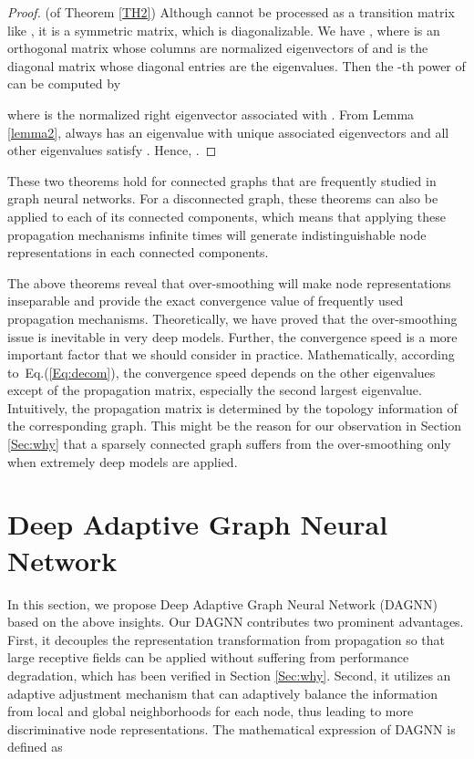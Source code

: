 \documentclass[sigconf]{acmart}
\begin{document}
\begin{proof}
(of Theorem \ref{TH2}) Although
 cannot be processed as a
transition matrix like , it
is a symmetric matrix, which is diagonalizable. We have
,
where  is an orthogonal matrix whose columns
are normalized eigenvectors of
 and 
is the diagonal matrix whose diagonal entries are the
eigenvalues. Then the -th power of
 can be computed by

where  is the normalized right eigenvector
associated with . From Lemma \ref{lemma2},
 always has an eigenvalue 
with unique associated eigenvectors and all other eigenvalues
 satisfy . Hence,
.
\end{proof}

These two theorems hold for connected graphs that are frequently
studied in graph neural networks. For a disconnected graph, these
theorems can also be applied to each of its connected components,
which means that applying these propagation mechanisms infinite times
will generate indistinguishable node representations in each
connected components.

The above theorems reveal that over-smoothing will make node
representations inseparable and provide the exact convergence value of
frequently used propagation mechanisms. Theoretically, we have
proved that the over-smoothing issue is inevitable in very deep models.
Further, the convergence speed is a more important factor that we
should consider in practice. Mathematically, according to~Eq.(\ref{Eq:decom}), the convergence speed depends on the other
eigenvalues except  of the propagation matrix, especially the
second largest eigenvalue. Intuitively, the propagation matrix is
determined by the topology information of the corresponding graph.
This might be the reason for our observation in Section
\ref{Sec:why} that a sparsely connected graph suffers from the
over-smoothing only when extremely deep models are applied.


\section{Deep Adaptive Graph Neural Network}

In this section, we propose Deep Adaptive Graph Neural Network (DAGNN) based on the above insights. Our DAGNN contributes two
prominent advantages. First, it decouples the representation
transformation from propagation so that large receptive fields
can be applied without suffering from performance degradation,
which has been verified in Section \ref{Sec:why}. Second, it
utilizes an adaptive adjustment mechanism that can adaptively
balance the information from local and global neighborhoods for
each node, thus leading to more discriminative node
representations. The mathematical expression of DAGNN is defined
as
\end{document}
